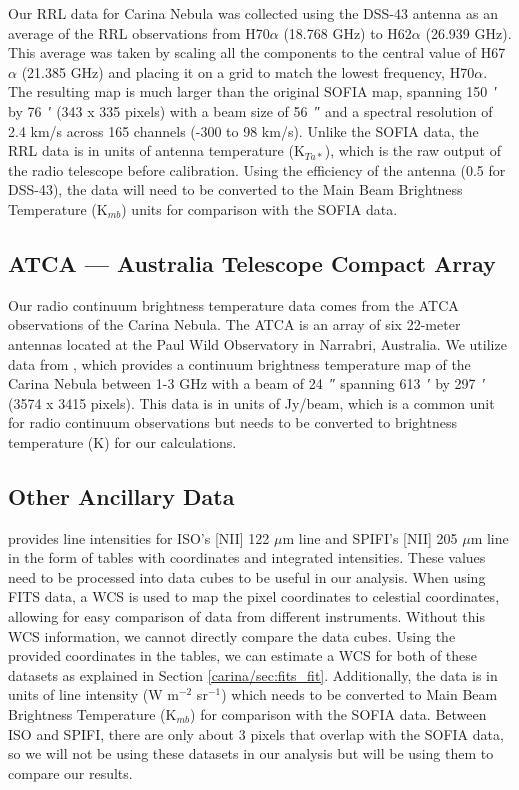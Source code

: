 Our RRL data for Carina Nebula was collected using the DSS-43 antenna as an average of the RRL observations from H70$\alpha$ (18.768 GHz) to H62$\alpha$ (26.939 GHz).
This average was taken by scaling all the components to the central value of H67$\alpha$ (21.385 GHz) and placing it on a grid to match the lowest frequency, H70$\alpha$.
The resulting map is much larger than the original SOFIA map, spanning \qty{150}{\arcminute} by \qty{76}{\arcminute} (343 x 335 pixels) with a beam size of \qty{56}{\arcsecond} and a spectral resolution of 2.4 km/s across 165 channels (-300 to 98 km/s).
Unlike the SOFIA data, the RRL data is in units of antenna temperature (K$_{Ta*}$), which is the raw output of the radio telescope before calibration.
Using the efficiency of the antenna (0.5 for DSS-43), the data will need to be converted to the Main Beam Brightness Temperature (K$_{mb}$) units for comparison with the SOFIA data.

\subsection{ATCA --- Australia Telescope Compact Array}
Our radio continuum brightness temperature data comes from the ATCA observations of the Carina Nebula.
The ATCA is an array of six 22-meter antennas located at the Paul Wild Observatory in Narrabri, Australia.
We utilize data from \cite{Rebolledo_2021}, which provides a continuum brightness temperature map of the Carina Nebula between 1-3 GHz with a beam of \qty{24}{\arcsecond} spanning \qty{613}{\arcminute} by \qty{297}{\arcminute} (3574 x 3415 pixels).
This data is in units of Jy/beam, which is a common unit for radio continuum observations but needs to be converted to brightness temperature (K) for our calculations.

\subsection{Other Ancillary Data}
\cite{oberst2011205} provides line intensities for ISO's [NII] 122 $\mu$m line and SPIFI's [NII] 205 $\mu$m line in the form of tables with coordinates and integrated intensities.
These values need to be processed into data cubes to be useful in our analysis.
When using FITS data, a WCS is used to map the pixel coordinates to celestial coordinates, allowing for easy comparison of data from different instruments.
Without this WCS information, we cannot directly compare the data cubes.
Using the provided coordinates in the tables, we can estimate a WCS for both of these datasets as explained in Section \ref{carina/sec:fits_fit}.
Additionally, the data is in units of line intensity (W m$^{-2}$ sr$^{-1}$) which needs to be converted to Main Beam Brightness Temperature (K$_{mb}$) for comparison with the SOFIA data.
Between ISO and SPIFI, there are only about 3 pixels that overlap with the SOFIA data, so we will not be using these datasets in our analysis but will be using them to compare our results.

